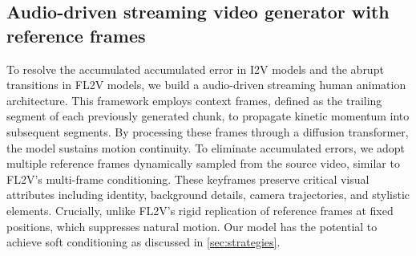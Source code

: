 

\subsection{Audio-driven streaming video generator with reference frames}
\label{sec:pipeline}


To resolve the accumulated accumulated error in I2V models and the abrupt transitions in FL2V models, we build a audio-driven streaming human animation architecture. This framework employs context frames, defined as the trailing segment of each previously generated chunk, to propagate kinetic momentum into subsequent segments. By processing these frames through a diffusion transformer, the model sustains motion continuity. To eliminate accumulated errors, we adopt multiple reference frames dynamically sampled from the source video, similar to FL2V's multi-frame conditioning. These keyframes preserve critical visual attributes including identity, background details, camera trajectories, and stylistic elements. Crucially, unlike FL2V's rigid replication of reference frames at fixed positions, which suppresses natural motion. Our model has the potential to achieve soft conditioning as discussed in \cref{sec:strategies}.


